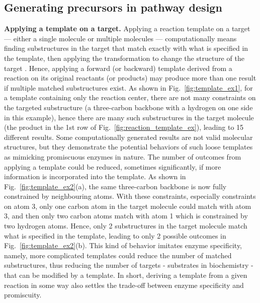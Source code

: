 \documentclass{article}
\begin{document}
\subsection{Generating precursors in pathway design}
\textbf{Applying a template on a target.} 
Applying a reaction template on a target --- either a single molecule or multiple molecules --- computationally means finding substructures in the target that match exactly with what is specified in the template, then applying the transformation to change the structure of the target \citep{daylightsmarts}.
Hence, applying a forward (or backward) template derived from a reaction on its original reactants (or products) may produce more than one result if multiple matched substructures exist. 
As shown in Fig.~\ref{fig:template_ex1}, for a template containing only the reaction center, there are not many constraints on the targeted substructure (a three-carbon backbone with a hydrogen on one side in this example), hence there are many such substructures in the target molecule (the product in the 1st row of Fig.~\ref{fig:reaction_template_ex}), leading to 15 different results. Some computationally generated results are not valid molecular structures, but they demonstrate the potential behaviors of such loose templates as mimicking promiscuous enzymes in nature.
The number of outcomes from applying a template could be reduced, sometimes significantly, if more information is incorporated into the template. 
As shown in Fig.~\ref{fig:template_ex2}(a), the same three-carbon backbone is now fully constrained by neighbouring atoms.
With these constraints, especially constraints on atom 3, only one carbon atom in the target molecule could match with atom 3, and then only two carbon atoms match with atom 1 which is constrained by two hydrogen atoms. Hence, only 2 substructures in the target molecule match what is specified in the template, leading to only 2 possible outcomes in Fig.~\ref{fig:template_ex2}(b).
This kind of behavior imitates enzyme specificity, namely, more complicated templates could reduce the number of matched substructures, thus reducing the number of targets - substrates in biochemistry - that can be modified by a template. 
In short, deriving a template from a given reaction in some way also settles the trade-off between enzyme specificity and promiscuity.
\end{document}
